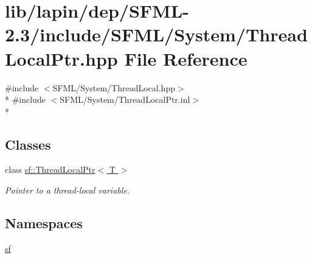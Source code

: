 \hypertarget{lapin_2dep_2_s_f_m_l-2_83_2include_2_s_f_m_l_2_system_2_thread_local_ptr_8hpp}{\section{lib/lapin/dep/\-S\-F\-M\-L-\/2.3/include/\-S\-F\-M\-L/\-System/\-Thread\-Local\-Ptr.hpp File Reference}
\label{lapin_2dep_2_s_f_m_l-2_83_2include_2_s_f_m_l_2_system_2_thread_local_ptr_8hpp}
}
{\ttfamily \#include $<$S\-F\-M\-L/\-System/\-Thread\-Local.\-hpp$>$}\\*
{\ttfamily \#include $<$S\-F\-M\-L/\-System/\-Thread\-Local\-Ptr.\-inl$>$}\\*
\subsection*{Classes}
\begin{DoxyCompactItemize}
\item 
class \hyperlink{classsf_1_1_thread_local_ptr}{sf\-::\-Thread\-Local\-Ptr$<$ T $>$}
\begin{DoxyCompactList}\small\item\em Pointer to a thread-\/local variable. \end{DoxyCompactList}\end{DoxyCompactItemize}
\subsection*{Namespaces}
\begin{DoxyCompactItemize}
\item 
\hyperlink{namespacesf}{sf}
\end{DoxyCompactItemize}
